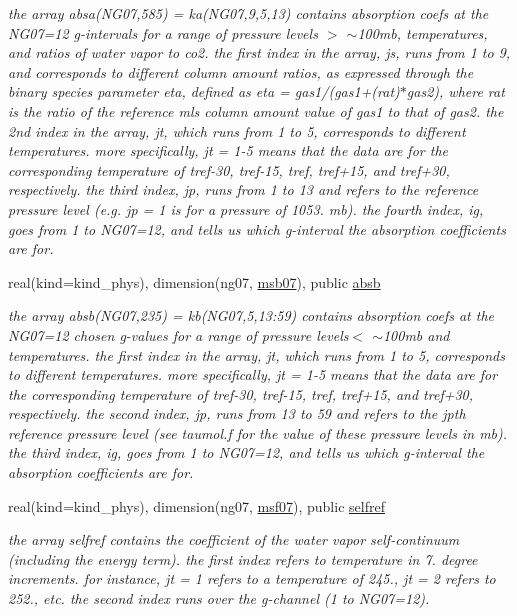 \begin{Indent}
\begin{DoxyCompactItemize}
\begin{DoxyCompactList}\small\item\em the array absa(\+N\+G07,585) = ka(\+N\+G07,9,5,13) contains absorption coefs at the N\+G07=12 g-\/intervals for a range of pressure levels $>$ $\sim$100mb, temperatures, and ratios of water vapor to co2. the first index in the array, js, runs from 1 to 9, and corresponds to different column amount ratios, as expressed through the binary species parameter eta, defined as eta = gas1/(gas1+(rat)$\ast$gas2), where rat is the ratio of the reference mls column amount value of gas1 to that of gas2. the 2nd index in the array, jt, which runs from 1 to 5, corresponds to different temperatures. more specifically, jt = 1-\/5 means that the data are for the corresponding temperature of tref-\/30, tref-\/15, tref, tref+15, and tref+30, respectively. the third index, jp, runs from 1 to 13 and refers to the reference pressure level (e.\+g. jp = 1 is for a pressure of 1053. mb). the fourth index, ig, goes from 1 to N\+G07=12, and tells us which g-\/interval the absorption coefficients are for. \end{DoxyCompactList}\item 
real(kind=kind\+\_\+phys), dimension(ng07, \hyperlink{group__module__radlw__kgbnn_gabba2139dfc5d8551f844f3809c28ce3c}{msb07}), public \hyperlink{group__module__radlw__kgbnn_gab0478438e9bbe64401aa492510f8d4bb}{absb}
\begin{DoxyCompactList}\small\item\em the array absb(\+N\+G07,235) = kb(\+N\+G07,5,13\+:59) contains absorption coefs at the N\+G07=12 chosen g-\/values for a range of pressure levels$<$ $\sim$100mb and temperatures. the first index in the array, jt, which runs from 1 to 5, corresponds to different temperatures. more specifically, jt = 1-\/5 means that the data are for the corresponding temperature of tref-\/30, tref-\/15, tref, tref+15, and tref+30, respectively. the second index, jp, runs from 13 to 59 and refers to the jpth reference pressure level (see taumol.\+f for the value of these pressure levels in mb). the third index, ig, goes from 1 to N\+G07=12, and tells us which g-\/interval the absorption coefficients are for. \end{DoxyCompactList}\item 
real(kind=kind\+\_\+phys), dimension(ng07, \hyperlink{group__module__radlw__kgbnn_ga9310f33501467fbadcf092d71559358b}{msf07}), public \hyperlink{group__module__radlw__kgbnn_gaaf6d41f390a0465af92756b9c3e6c558}{selfref}
\begin{DoxyCompactList}\small\item\em the array selfref contains the coefficient of the water vapor self-\/continuum (including the energy term). the first index refers to temperature in 7. degree increments. for instance, jt = 1 refers to a temperature of 245., jt = 2 refers to 252., etc. the second index runs over the g-\/channel (1 to N\+G07=12). \end{DoxyCompactList}\item 

\end{DoxyCompactItemize}
\end{Indent}
